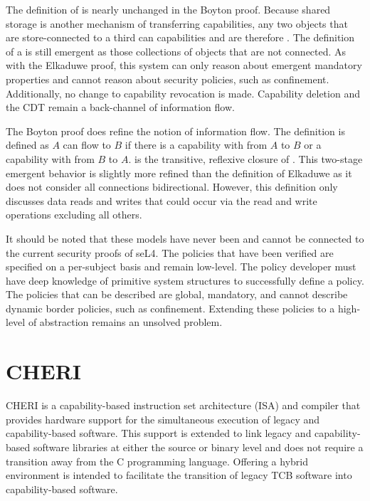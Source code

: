 The definition of  is nearly unchanged in the Boyton proof.
Because shared storage is another mechanism of transferring capabilities, any two objects that are store-connected to a third can  capabilities and are therefore .
The definition of a  is still emergent as those collections of objects that are not connected.
As with the Elkaduwe proof, this system can only reason about emergent mandatory properties and cannot reason about security policies, such as confinement.
Additionally, no change to capability revocation is made.
Capability deletion and the CDT remain a back-channel of information flow.

The Boyton proof does refine the notion of information flow.
The definition  is defined as \(A\) can flow to \(B\) if there is a capability with  from \(A\) to \(B\) or a capability with  from \(B\) to \(A\).
 is the transitive, reflexive closure of .
This two-stage emergent behavior is slightly more refined than the  definition of Elkaduwe as it does not consider all connections bidirectional.
However, this definition only discusses data reads and writes that could occur via the read and write operations excluding all others.

It should be noted that these models have never been and cannot be connected to the current security proofs of seL4.
The policies that have been verified are specified on a per-subject basis and remain low-level.
The policy developer must have deep knowledge of primitive system structures to successfully define a policy. 
The policies that can be described are global, mandatory, and cannot describe dynamic border policies, such as confinement.
Extending these policies to a high-level of abstraction remains an unsolved problem.

\section{CHERI}

CHERI is a capability-based instruction set architecture (ISA) and compiler that provides hardware support for the simultaneous execution of legacy and capability-based software. \cite{watson2015cheri}
This support is extended to link legacy and capability-based software libraries at either the source or binary level and does not require a transition away from the C programming language.
Offering a hybrid environment is intended to facilitate the transition of legacy TCB software into capability-based software.

